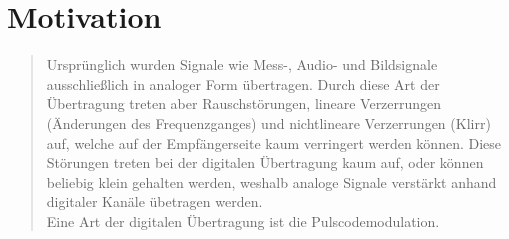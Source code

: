 \section{Motivation}
\begin{quote}
	
	Ursprünglich wurden Signale wie Mess-, Audio- und Bildsignale ausschließlich in
	analoger Form übertragen. Durch diese Art der Übertragung treten aber
	Rauschstörungen, lineare Verzerrungen (Änderungen des Frequenzganges) und
	nichtlineare Verzerrungen (Klirr) auf, welche auf der Empfängerseite kaum
	verringert werden können. Diese Störungen treten bei der digitalen Übertragung
	kaum auf, oder können beliebig klein gehalten werden, weshalb analoge Signale
	verstärkt anhand digitaler Kanäle übetragen werden.\\
	Eine Art der digitalen Übertragung ist die Pulscodemodulation.
	
\end{quote} %



